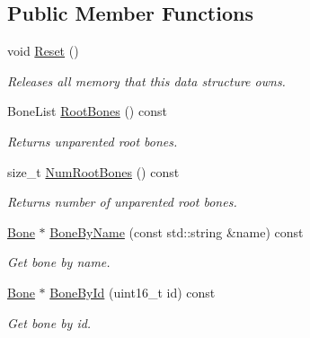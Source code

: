 \subsection*{Public Member Functions}
\begin{DoxyCompactItemize}
\item 
\hypertarget{class_assimp_1_1_ogre_1_1_skeleton_a549f50cf99f4e54f07c9f0d95d5d3ec7}{void \hyperlink{class_assimp_1_1_ogre_1_1_skeleton_a549f50cf99f4e54f07c9f0d95d5d3ec7}{Reset} ()}\label{class_assimp_1_1_ogre_1_1_skeleton_a549f50cf99f4e54f07c9f0d95d5d3ec7}

\begin{DoxyCompactList}\small\item\em Releases all memory that this data structure owns. \end{DoxyCompactList}\item 
\hypertarget{class_assimp_1_1_ogre_1_1_skeleton_ad4e28ca6cc13d5c0be57b089246674c0}{Bone\+List \hyperlink{class_assimp_1_1_ogre_1_1_skeleton_ad4e28ca6cc13d5c0be57b089246674c0}{Root\+Bones} () const }\label{class_assimp_1_1_ogre_1_1_skeleton_ad4e28ca6cc13d5c0be57b089246674c0}

\begin{DoxyCompactList}\small\item\em Returns unparented root bones. \end{DoxyCompactList}\item 
\hypertarget{class_assimp_1_1_ogre_1_1_skeleton_a09ca73fe43aaf7257c83ad1f1ee8f084}{size\+\_\+t \hyperlink{class_assimp_1_1_ogre_1_1_skeleton_a09ca73fe43aaf7257c83ad1f1ee8f084}{Num\+Root\+Bones} () const }\label{class_assimp_1_1_ogre_1_1_skeleton_a09ca73fe43aaf7257c83ad1f1ee8f084}

\begin{DoxyCompactList}\small\item\em Returns number of unparented root bones. \end{DoxyCompactList}\item 
\hypertarget{class_assimp_1_1_ogre_1_1_skeleton_a9c18fbab69f77ae9c32183c0d2b453a9}{\hyperlink{class_assimp_1_1_ogre_1_1_bone}{Bone} $\ast$ \hyperlink{class_assimp_1_1_ogre_1_1_skeleton_a9c18fbab69f77ae9c32183c0d2b453a9}{Bone\+By\+Name} (const std\+::string \&name) const }\label{class_assimp_1_1_ogre_1_1_skeleton_a9c18fbab69f77ae9c32183c0d2b453a9}

\begin{DoxyCompactList}\small\item\em Get bone by name. \end{DoxyCompactList}\item 
\hypertarget{class_assimp_1_1_ogre_1_1_skeleton_a03d936924c99daaa44701348b8ab1f5e}{\hyperlink{class_assimp_1_1_ogre_1_1_bone}{Bone} $\ast$ \hyperlink{class_assimp_1_1_ogre_1_1_skeleton_a03d936924c99daaa44701348b8ab1f5e}{Bone\+By\+Id} (uint16\+\_\+t id) const }\label{class_assimp_1_1_ogre_1_1_skeleton_a03d936924c99daaa44701348b8ab1f5e}

\begin{DoxyCompactList}\small\item\em Get bone by id. \end{DoxyCompactList}\end{DoxyCompactItemize}
